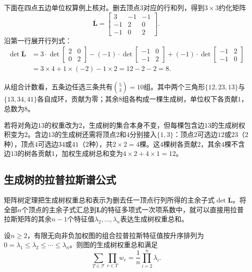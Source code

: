 下面在四点五边单位权算例上核对。删去顶点$3$对应的行和列，得到$3\times 3$约化矩阵
\[
  \overline{\bm L}=
  \begin{bmatrix}
  3&-1&-1\\
  -1&2&0\\
  -1&0&2
  \end{bmatrix}.
\]
沿第一行展开行列式：
\[
  \begin{aligned}
    \det\overline{\bm L}
    &=3\cdot\det\begin{bmatrix}2&0\\0&2\end{bmatrix}
      -(-1)\cdot\det\begin{bmatrix}-1&0\\-1&2\end{bmatrix}
      +(-1)\cdot\det\begin{bmatrix}-1&2\\-1&0\end{bmatrix}\\
    &=3\times 4 + 1\times(-2) - 1\times 2 = 12-2-2=8.
  \end{aligned}
\]

从组合计数看，五条边任选三条共有$\binom53=10$组。其中两个三角形$\{12,23,13\}$与$\{13,34,41\}$各自成环，贡献为零；其余$8$组各构成一棵生成树，单位权下各贡献$1$，总数为$8$。

若将对角边$13$的权重改为$2$，生成树的集合本身不变，但每棵包含边$13$的生成树权积变为$2$。含边$13$的生成树还需将顶点$2$和$4$分别接入$\{1,3\}$：顶点$2$可选边$12$或$23$（$2$种），顶点$4$可选边$34$或$41$（$2$种），共$2\times 2=4$棵。这$4$棵树各贡献$2$，其余$4$棵不含边$13$的树各贡献$1$，加权生成树总和变为$4\times 2+4\times 1=12$。

\subsection{生成树的拉普拉斯谱公式}
\label{sec:graph-tree-counting-formulas}

矩阵树定理把生成树权重总和表示为删去任一顶点行列所得的主余子式$\det\overline{\bm L}$。将全部$n$个顶点的主余子式汇总到$\bm L$的特征多项式一次项系数中，就可以直接用拉普拉斯矩阵的其余$n-1$个特征值$\lambda_2,\ldots,\lambda_n$表达生成树权重总和。

\begin{theorem}[生成树计数的拉普拉斯谱公式]
\label{cor:graph-tree-count-spectrum}
设$n\geq 2$，有限无向非负加权图的组合拉普拉斯特征值按升序排列为$0=\lambda_1\leq\lambda_2\leq\cdots\leq\lambda_n$。则图的生成树权重总和满足
\begin{equation}
  \sum_{T\in\mathcal T}\prod_{e\in T}w_e
  =\frac1n\prod_{i=2}^n\lambda_i.
  \label{eq:graph-tree-count-from-spectrum}
\end{equation}
\end{theorem}

